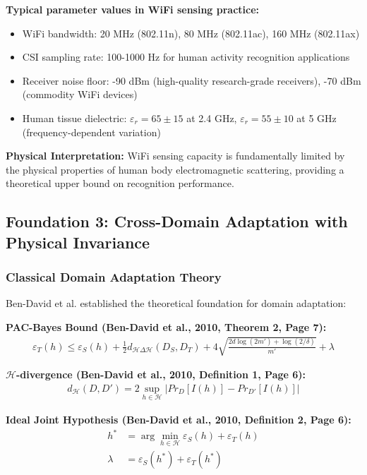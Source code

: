 \documentclass[12pt,a4paper]{article}
\begin{document}
\textbf{Typical parameter values in WiFi sensing practice:}
\begin{itemize}
\item WiFi bandwidth: 20 MHz (802.11n), 80 MHz (802.11ac), 160 MHz (802.11ax)
\item CSI sampling rate: 100-1000 Hz for human activity recognition applications
\item Receiver noise floor: -90 dBm (high-quality research-grade receivers), -70 dBm (commodity WiFi devices)
\item Human tissue dielectric: $\varepsilon_r = 65 \pm 15$ at 2.4 GHz, $\varepsilon_r = 55 \pm 10$ at 5 GHz (frequency-dependent variation)
\end{itemize}

\textbf{Physical Interpretation:} WiFi sensing capacity is fundamentally limited by the physical properties of human body electromagnetic scattering, providing a theoretical upper bound on recognition performance.

\subsection{Foundation 3: Cross-Domain Adaptation with Physical Invariance}

\subsubsection{Classical Domain Adaptation Theory}

Ben-David et al. \cite{ben2010theory} established the theoretical foundation for domain adaptation:

\textbf{PAC-Bayes Bound (Ben-David et al., 2010, Theorem 2, Page 7):}
\begin{align}
\varepsilon_T(h) \leq \varepsilon_S(h) + \frac{1}{2}d_{\mathcal{H}\Delta\mathcal{H}}(D_S,D_T) + 4\sqrt{\frac{2d\log(2m') + \log(2/\delta)}{m'}} + \lambda \label{eq:bendavid_bound}
\end{align}

\textbf{$\mathcal{H}$-divergence (Ben-David et al., 2010, Definition 1, Page 6):}
\begin{align}
d_{\mathcal{H}}(D,D') = 2 \sup_{h \in \mathcal{H}} |Pr_{D}[I(h)] - Pr_{D'}[I(h)]| \label{eq:h_divergence}
\end{align}

\textbf{Ideal Joint Hypothesis (Ben-David et al., 2010, Definition 2, Page 6):}
\begin{align}
h^* &= \arg\min_{h \in \mathcal{H}} \varepsilon_S(h) + \varepsilon_T(h) \label{eq:ideal_hypothesis}\\
\lambda &= \varepsilon_S(h^*) + \varepsilon_T(h^*) \label{eq:lambda_definition}
\end{align}
\end{document}
